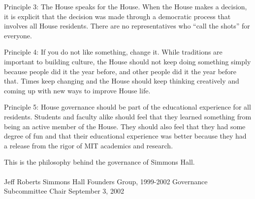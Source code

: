 \documentclass[letterpaper]{article}
\begin{document}
Principle 3: The House speaks for the House. When the House makes a decision, it is explicit that the decision was made through a democratic process that involves all House residents. There are no representatives who ``call the shots'' for everyone.

Principle 4: If you do not like something, change it. While traditions are important to building culture, the House should not keep doing something simply because people did it the year before, and other people did it the year before that. Times keep changing and the House should keep thinking creatively and coming up with new ways to improve House life.

Principle 5: House governance should be part of the educational experience for all residents. Students and faculty alike should feel that they learned something from being an active member of the House. They should also feel that they had some degree of fun and that their educational experience was better because they had a release from the rigor of MIT academics and research.

This is the philosophy behind the governance of Simmons Hall.
\\
\\
Jeff Roberts\newline
Simmons Hall Founders Group, 1999-2002\newline
Governance Subcommittee Chair\newline
September 3, 2002
\clearpage
\end{document}
